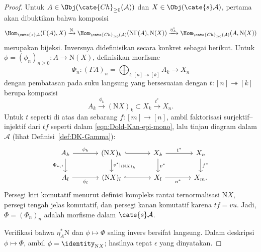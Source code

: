 \begin{proof}
	Untuk $A\in\Obj(\cate{Ch}_{\geq0}(\mathcal{A}))$ dan
	$X\in\Obj(\cate{s}\mathcal{A})$, pertama akan dibuktikan bahwa komposisi
	\[ \Hom_{\cate{s}\mathcal{A}}(\Gamma(A), X) \xrightarrow{\mathrm{N}} \Hom_{\cate{Ch}_{\geq 0}(\mathcal{A})}(\mathrm{N}\Gamma(A), \mathrm{N}(X)) \xrightarrow{\eta_A^*} \Hom_{\cate{Ch}_{\geq 0}(\mathcal{A})}(A, \mathrm{N}(X)) \]
	merupakan bijeksi. Inversnya didefinisikan secara konkret sebagai berikut. Untuk
	$\phi=(\phi_n)_{n\geq0}:A\to\mathrm{N}(X)$, definisikan morfisme
	\[ \Phi_n: (\Gamma A)_n = \bigoplus_{t: [n] \twoheadrightarrow [k]} A_k \to X_n \]
	dengan pembatasan pada suku langsung yang bersesuaian dengan
	$t:[n]\twoheadrightarrow[k]$ berupa komposisi
	\[ A_k \xrightarrow{\phi_k} (\mathrm{N}X)_k \subset X_k \xrightarrow{t^*} X_n. \]
	Untuk $t$ seperti di atas dan sebarang $f:[m]\to[n]$, ambil faktorisasi
	surjektif--injektif dari $tf$ seperti dalam
	\eqref{eqn:Dold-Kan-epi-mono}, lalu tinjau diagram dalam $\mathcal{A}$
	(lihat Definisi~\ref{def:DK-Gamma}):
	\[\begin{tikzcd}[column sep=large]
		A_k \arrow[r, "\phi_k"] \arrow[d, "{\Phi_{u, t}}"'] & (\mathrm{N}X)_k \arrow[hookrightarrow, r] \arrow[d, "{v^*|_{(\mathrm{N}X)_k}}"] & X_k \arrow[r, "{t^*}"] \arrow[d, "{v^*}"] & X_n \arrow[d, "{f^*}"] \\
		A_l \arrow[r, "\phi_l"'] & (\mathrm{N}X)_l \arrow[hookrightarrow, r] & X_l \arrow[r, "{u^*}"'] & X_m.
	\end{tikzcd}\]
	Persegi kiri komutatif menurut definisi kompleks rantai ternormalisasi
	$\mathrm{N}X$, persegi tengah jelas komutatif, dan persegi kanan komutatif
	karena $tf=vu$. Jadi, $\Phi=(\Phi_n)_n$ adalah morfisme dalam
	$\cate{s}\mathcal{A}$.

	Verifikasi bahwa $\eta_A^*\mathrm{N}$ dan $\phi\mapsto\Phi$ saling invers
	bersifat langsung. Dalam deskripsi $\phi\mapsto\Phi$, ambil
	$\phi=\identity_{\mathrm{N}X}$; hasilnya tepat $\epsilon$ yang dinyatakan.
\end{proof}

